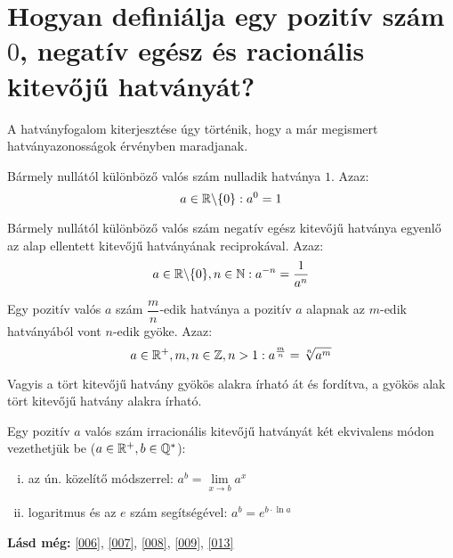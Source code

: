 
\section{Hogyan definiálja egy pozitív szám \texorpdfstring{$0$}{0}, negatív
  egész és racionális kitevőjű hatványát?}
\label{012}

A hatványfogalom kiterjesztése úgy történik, hogy a már megismert
hatványazonosságok érvényben maradjanak.

\begin{defin}
Bármely nullától különböző valós szám nulladik hatványa $1$. Azaz:
\[
  a \in \mathbb{R} \backslash \{0\}: a^0 = 1
\]
\end{defin}

\begin{defin}
Bármely nullától különböző valós szám negatív egész kitevőjű hatványa egyenlő
az alap ellentett kitevőjű hatványának reciprokával. Azaz:
\[
  a \in \mathbb{R} \backslash \{0\}, n \in \mathbb{N}: a^{-n} = \dfrac{1}{a^n}
\]
\end{defin}

\begin{defin}
Egy pozitív valós $a$ szám $\dfrac{m}{n}$-edik hatványa a pozitív $a$ alapnak
az $m$-edik hatványából vont $n$-edik gyöke. Azaz:
\[
  a \in \mathbb{R}^+, m, n \in \mathbb{Z}, n > 1: a^{\frac{m}{n}} = \sqrt[n]{a^m}
\]

Vagyis a tört kitevőjű hatvány gyökös alakra írható át és fordítva, a gyökös
alak tört kitevőjű hatvány alakra írható.
\end{defin}

\begin{defin4}
Egy pozitív $a$ valós szám irracionális kitevőjű hatványát két ekvivalens módon
vezethetjük be ($a \in \mathbb{R}^+, b \in \mathbb{Q^*}$):
\begin{enumerate}[i)]
\item az ún. közelítő módszerrel: $a^b = \lim\limits_{x \to b} a^x$
\item logaritmus és az $e$ szám segítségével: $a^b = e^{b \cdot \ln a}$
\end{enumerate}
\end{defin4}

\textbf{Lásd még:} \ref{006}, \ref{007}, \ref{008}, \ref{009}, \ref{013}
